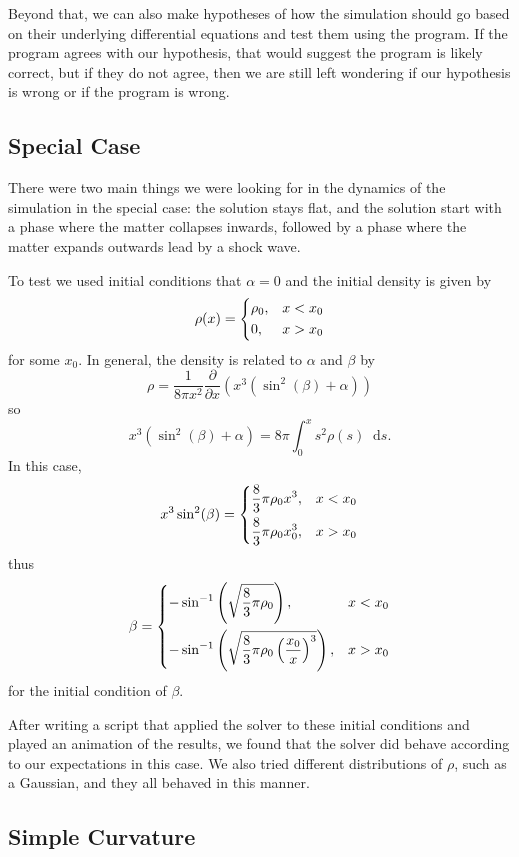 \documentclass[12pt]{article}
\newcommand{\dd}{\mathop{}\!\mathrm{d}}
\begin{document}
Beyond that, we can also make hypotheses of how the simulation should go based on their
underlying differential equations and test them using the program. If the program agrees
with our hypothesis, that would suggest the program is likely correct, but if they do
not agree, then we are still left wondering if our hypothesis is wrong or if the program
is wrong.

\subsection{Special Case}

There were two main things we were looking for in the dynamics of the simulation in the
special case: the solution stays flat, and the solution start with a phase where the
matter collapses inwards, followed by a phase where the matter expands outwards lead by
a shock wave.

To test we used initial conditions that $\alpha = 0$ and the initial density is given by
\[ \rho(x) = \begin{dcases}
    \rho_0, & x < x_0 \\
    0, & x > x_0
\end{dcases} \]
for some $x_0$. In general, the density is related to $\alpha$ and $\beta$ by
\[ \rho = \frac{1}{8\pi x^2} \frac{\partial}{\partial x} (x^3 (\sin^2(\beta) + \alpha))
\]
so
\[ x^3(\sin^2(\beta) + \alpha) = 8\pi \int_0^x\! s^2 \rho(s) \dd s. \]
In this case,
\[ x^3\sin^2(\beta) = \begin{dcases}
    \frac{8}{3}\pi\rho_0 x^3, & x < x_0 \\
    \frac{8}{3}\pi\rho_0 x_0^3, & x > x_0
\end{dcases} \]
thus
\[ \beta = \begin{dcases}
    -\sin^{-1}\left(\sqrt{\frac{8}{3}\pi\rho_0}\right), & x < x_0 \\
    -\sin^{-1}\left(\sqrt{\frac{8}{3}\pi\rho_0 \left(\frac{x_0}{x}\right)^3}\right), & x
    > x_0
\end{dcases} \]
for the initial condition of $\beta$.

After writing a script that applied the solver to these initial conditions and played an
animation of the results, we found that the solver did behave according to our
expectations in this case. We also tried different distributions of $\rho$, such as a
Gaussian, and they all behaved in this manner.

\subsection{Simple Curvature}
\end{document}
